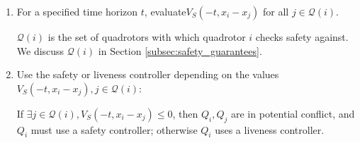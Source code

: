 \begin{enumerate}
\item For a specified time horizon $t$, evaluate$V_S(-t,x_i-x_j)$ for all $j\in \mathcal{Q}(i)$.

$\mathcal{Q}(i)$ is the set of quadrotors with which quadrotor $i$ checks safety against. We discuss $\mathcal{Q}(i)$ in Section \ref{subsec:safety_guarantees}.

\item Use the safety or liveness controller depending on the values $V_S(-t,x_i-x_j),j\in \mathcal{Q}(i)$: 

If $\exists j\in \mathcal{Q}(i),V_S(-t,x_i-x_j)\le 0$, then $Q_i,Q_j$ are in potential conflict, and $Q_i$ must use a safety controller; otherwise $Q_i$ uses a liveness controller.
\end{enumerate}